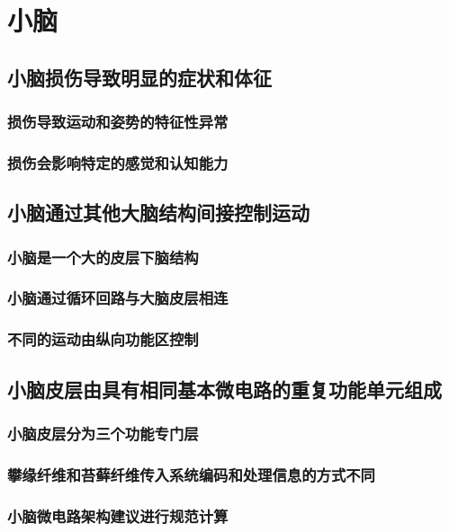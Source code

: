 \chapter{小脑}




\section{小脑损伤导致明显的症状和体征}
\subsection{损伤导致运动和姿势的特征性异常}
\subsection{损伤会影响特定的感觉和认知能力}

\section{小脑通过其他大脑结构间接控制运动}
\subsection{小脑是一个大的皮层下脑结构}
\subsection{小脑通过循环回路与大脑皮层相连}
\subsection{不同的运动由纵向功能区控制}

\section{小脑皮层由具有相同基本微电路的重复功能单元组成}
\subsection{小脑皮层分为三个功能专门层}
\subsection{攀缘纤维和苔藓纤维传入系统编码和处理信息的方式不同}
\subsection{小脑微电路架构建议进行规范计算}

